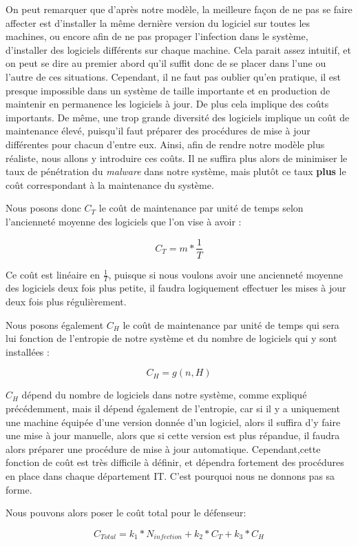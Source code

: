 On peut remarquer que d'après notre modèle, la meilleure façon de ne pas se faire affecter est d'installer la même dernière version du logiciel sur toutes les machines, ou encore afin de ne pas propager l'infection dans le système, d'installer des logiciels différents sur chaque machine. Cela parait assez intuitif, et on peut se dire au premier abord qu'il suffit donc de se placer dans l'une ou l'autre de ces situations. Cependant, il ne faut pas oublier qu'en pratique, il est presque impossible dans un système de taille importante et en production de maintenir en permanence les logiciels à jour. De plus cela implique des coûts importants. De même, une trop grande diversité des logiciels implique un coût de maintenance élevé, puisqu'il faut préparer des procédures de mise à jour différentes pour chacun d'entre eux.
Ainsi, afin de rendre notre modèle plus réaliste, nous allons y introduire ces coûts. Il ne suffira plus alors de minimiser le taux de pénétration du \textit{malware} dans notre système, mais plutôt ce taux \textbf{plus} le coût correspondant à la maintenance du système.

Nous posons donc $C_T$ le coût de maintenance par unité de temps selon l'ancienneté moyenne des logiciels que l'on vise à avoir :

\[
C_T=m*\frac{1}{T}
\]

Ce coût est linéaire en $\frac{1}{T}$, puisque si nous voulons avoir une ancienneté moyenne des logiciels deux fois plus petite, il faudra logiquement effectuer les mises à jour deux fois plus régulièrement.

Nous posons également $C_H$ le coût de maintenance par unité de temps qui sera lui fonction de l'entropie de notre système et du nombre de logiciels qui y sont installées :

\[
C_H = g(n,H)
\]

$C_H$ dépend du nombre de logiciels dans notre système, comme expliqué précédemment, mais il dépend également de l'entropie, car si il y a uniquement une machine équipée d'une version donnée d'un logiciel, alors il suffira d'y faire une mise à jour manuelle, alors que si cette version est plus répandue, il faudra alors préparer une procédure de mise à jour automatique. Cependant,cette fonction de coût est très difficile à définir, et dépendra fortement des procédures en place dans chaque département IT. C'est pourquoi nous ne donnons pas sa forme.

Nous pouvons alors poser le coût total pour le défenseur:

\[
C_{Total}=k_1*N_{infection}+k_2*C_T+k_3*C_H
\]

